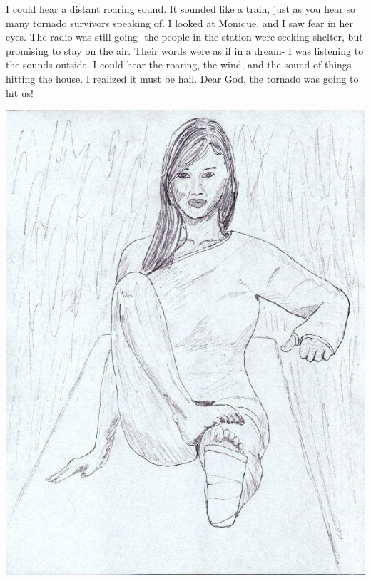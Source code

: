 I could hear a distant roaring sound. It sounded like a train, just as you hear so many
tornado survivors speaking of. I looked at Monique, and I saw fear in her eyes. The radio was
still going- the people in the station were seeking shelter, but promising to stay on the air.
Their words were as if in a dream- I was listening to the sounds outside. I could hear the
roaring, the wind, and the sound of things hitting the house. I realized it must be hail. Dear
God, the tornado was going to hit us!

\begin{center}
\includegraphics{images/kicks26.jpg}
\end{center}
